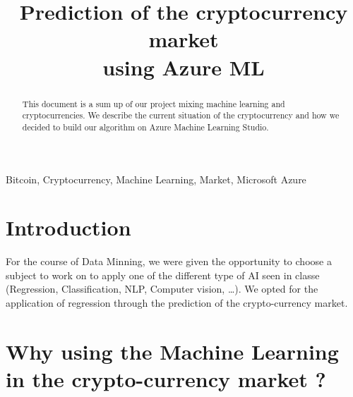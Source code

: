 \documentclass[conference]{IEEEtran}
\begin{document}
\title{Prediction of the cryptocurrency market\\ using Azure ML\\
}

\author{
\and
{}
\and
{}
}

\maketitle

\begin{abstract}
This document is a sum up of our project mixing machine learning and cryptocurrencies. We describe the current situation of the cryptocurrency and how we decided to build our algorithm on Azure Machine Learning Studio.
\end{abstract}

\begin{IEEEkeywords}
Bitcoin, Cryptocurrency, Machine Learning, Market, Microsoft Azure
\end{IEEEkeywords}

\section{Introduction}

For the course of Data Minning, we were given the opportunity to choose a subject to work on to apply one of the different type of AI seen in classe (Regression, Classification, NLP, Computer vision, \dots). We opted for the application of regression through the prediction of the crypto-currency market. 

\section{Why using the Machine Learning in the crypto-currency market ?}
\end{document}
